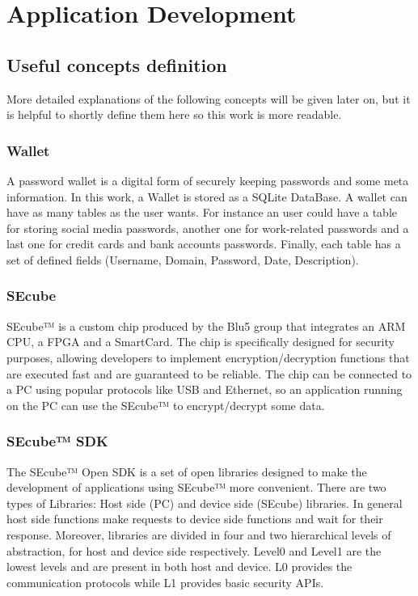 \chapter{Application Development} \label{chap:dev}


\section{Useful concepts definition}

More detailed explanations of the following concepts will be given later on, but it is helpful to shortly define them here so this work is more readable.

\subsection{Wallet} A password wallet is a digital form of securely keeping passwords and some meta information. In this work, a Wallet is stored as a SQLite DataBase. A wallet can have as many tables as the user wants. For instance an user could have a table for storing social media passwords, another one for work-related passwords and a last one for credit cards and bank accounts passwords. Finally, each table has a set of defined fields (Username, Domain, Password, Date, Description).

\subsection{SEcube} SEcube™ is a custom chip produced by the Blu5 group \cite{Blu5} that integrates an ARM CPU, a FPGA and a SmartCard. The chip is specifically designed for security purposes, allowing developers to implement encryption/decryption functions that are executed fast and are guaranteed to be reliable. The chip can be connected to a PC using popular protocols like USB and Ethernet, so an application running on the PC can use the SEcube™ to encrypt/decrypt some data.

\subsection{SEcube™ SDK} The SEcube™ Open SDK is a set of open libraries designed to make the development of applications using SEcube™ more convenient. There are two types of Libraries: Host side (PC) and device side (SEcube) libraries. In general host side functions make requests to device side functions and wait for their response. Moreover, libraries are divided in four and two hierarchical levels of abstraction, for host and device side respectively. Level0 and Level1 are the lowest levels and are present in both host and device. L0 provides the communication protocols while L1 provides basic security APIs.

